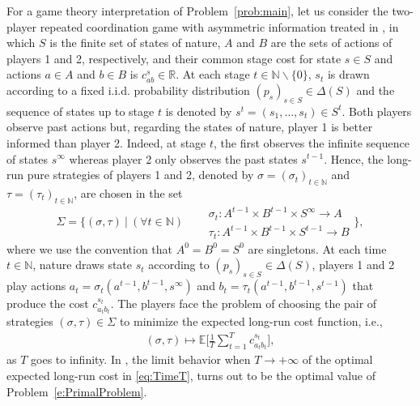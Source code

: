\documentclass[smallextended,referee,envcountsect,]{svjour3}
\newcommand{\NN}{{\mathbb N}}
\newcommand{\R}{{\mathbb R}}
\newcommand{\E}{{\mathbb E}}
\newcommand{\Menge}[2]{\bigg\{{#1}~\bigg|~{#2}\bigg\}}
\begin{document}
For a game theory interpretation of Problem~\ref{prob:main}, let 
us consider the {two-player} repeated coordination game with 
asymmetric information treated in 
\cite{GossnerHernandezNeyman06}, in which $S$ is the finite set 
of states of nature, $A$ and $B$ are the sets of actions of players 
1 and 2, respectively, and their common stage cost for state $s\in 
S$ and actions $a\in A$ and $b\in B$ is $c_{ab}^s\in\R$. At each 
stage $t\in\mathbb{N}\smallsetminus\{0\}$, $s_t$ is 
drawn according to a fixed i.i.d. probability distribution $(p_s)_{s\in 
S}\in\Delta(S)$ and the sequence of states up to stage 
$t$ is denoted by $s^t=(s_1,\ldots,s_t) \in S^t$. 
Both players observe past actions but, regarding the states of 
nature, player 1 is better informed than player 2. Indeed, at stage 
$t$, the first observes the infinite sequence of states $s^{\infty}$ 
whereas player 2 only observes the past states $s^{t-1}$. Hence, 
the long-run pure strategies of players 1 and 2, denoted by 
$\sigma = (\sigma_t)_{t\in\NN}$ and $\tau = (\tau_t)_{t\in\NN}$, 
are chosen in the set 
\begin{equation}
\label{e:strat}
\Sigma=\Menge{(\sigma,\tau)}{(\forall t\in\NN)\quad 
\begin{aligned}
&\sigma_t : A^{t-1}\times  B^{t-1}\times S^{\infty}  \to A\\[-2pt]
&\tau_t :  A^{t-1}\times  B^{t-1}\times S^{t-1}\to B
\end{aligned}
},
\end{equation}
{where we} use the convention that $A^0=B^0=S^0$ are 
singletons.  At each time 
$t\in\NN$, nature {draws} state $s_t$ according to $(p_s)_{s\in 
S}\in\Delta(S)$, players 1 and 
2 play actions $a_t=\sigma_t(a^{t-1},b^{t-1},s^{\infty})$ and 
$b_t=\tau_t(a^{t-1},b^{t-1},s^{t-1})$ that produce the cost $c_{a_tb_t}^{s_t}$. The players face the 
problem of choosing the pair of strategies $(\sigma,\tau)\in\Sigma$ 
to minimize 
the expected long-run cost function, i.e.,
\begin{align}
(\sigma,\tau)\mapsto \E\bigg[\frac{1}{T} \sum_{t=1}^T c_{a_tb_t}^{s_t}\bigg], 
\label{eq:TimeT}
\end{align}
as $T$ goes to infinity. In \cite[Theorems~1 \& 
2]{GossnerHernandezNeyman06}, the limit behavior when 
$T\to+\infty$ of the optimal 
expected long-run 
cost in \eqref{eq:TimeT}, turns out to be the optimal value of 
Problem~\ref{e:PrimalProblem}.
\end{document}
